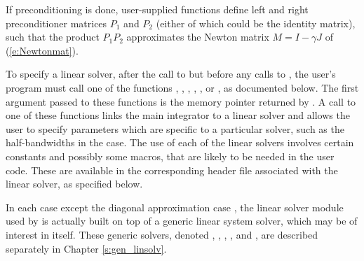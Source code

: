 If preconditioning is done, user-supplied functions define left and right 
preconditioner matrices $P_1$ and $P_2$ (either of which could be the identity
matrix), such that the product $P_1 P_2$ approximates the Newton matrix
$M = I - \gamma J$ of (\ref{e:Newtonmat}).

To specify a {\cvodes} linear solver, after the call to 
but before any calls to , the user's program must call one
of the functions , , , ,
, or , as documented below.
The first argument passed to these functions is the {\cvodes}
memory pointer returned by .  A call to one of these
functions links the main {\cvodes} integrator to a linear solver and
allows the user to specify parameters which are specific to a
particular solver, such as the half-bandwidths in the {\cvband} case.
The use of each of the linear solvers involves certain constants and possibly 
some macros, that are likely to be needed in the user code.  These are
available in the corresponding header file associated with the linear
solver, as specified below.

In each case except the diagonal approximation case {\cvdiag}, the linear
solver module used by {\cvodes} is actually built on top of a generic
linear system solver, which may be of interest in itself.  These generic
solvers, denoted {\dense}, {\band}, {\spgmr}, {\spbcg}, and {\sptfqmr},
are described separately in Chapter \ref{s:gen_linsolv}.

